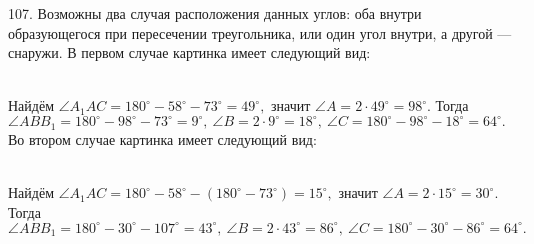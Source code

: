 107. Возможны два случая расположения данных углов: оба внутри образующегося при пересечении треугольника, или один угол внутри, а другой --- снаружи. В первом случае картинка имеет следующий вид:
\begin{figure}[ht!]
\end{figure}\\
Найдём $\angle A_1AC=180^\circ-58^\circ-73^\circ=49^\circ,$ значит $\angle A=2\cdot49^\circ=98^\circ.$ Тогда $\angle ABB_1=180^\circ-98^\circ-73^\circ=9^\circ,\ \angle B=2\cdot9^\circ=18^\circ,\ \angle C=180^\circ-98^\circ-18^\circ=64^\circ.$\\
Во втором случае картинка имеет следующий вид:
\begin{figure}[ht!]
\end{figure}\\
Найдём $\angle A_1AC=180^\circ-58^\circ-(180^\circ-73^\circ)=15^\circ,$ значит $\angle A=2\cdot15^\circ=30^\circ.$ Тогда $\angle ABB_1=180^\circ-30^\circ-107^\circ=43^\circ,\ \angle B=2\cdot43^\circ=86^\circ,\ \angle C=180^\circ-30^\circ-86^\circ=64^\circ.$\\
